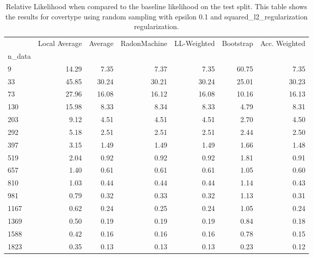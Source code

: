 \begin{table}
\centering
\caption{Relative Likelihood when compared to the baseline likelihood on the test split. This table shows the results for  covertype using  random sampling with epsilon  0.1 and  squared_l2_regularization regularization.}
\label{tab:14}
\begin{tabular}{lrrrrrr}
\toprule
{} &  Local Average &  Average &  RadonMachine &  LL-Weighted &  Bootstrap &  Acc. Weighted \\
n\_data &                &          &               &              &            &                \\
\midrule
9      &          14.29 &     7.35 &          7.37 &         7.35 &      60.75 &           7.35 \\
33     &          45.85 &    30.24 &         30.21 &        30.24 &      25.01 &          30.23 \\
73     &          27.96 &    16.08 &         16.12 &        16.08 &      10.16 &          16.13 \\
130    &          15.98 &     8.33 &          8.34 &         8.33 &       4.79 &           8.31 \\
203    &           9.12 &     4.51 &          4.51 &         4.51 &       2.70 &           4.50 \\
292    &           5.18 &     2.51 &          2.51 &         2.51 &       2.44 &           2.50 \\
397    &           3.15 &     1.49 &          1.49 &         1.49 &       1.66 &           1.48 \\
519    &           2.04 &     0.92 &          0.92 &         0.92 &       1.81 &           0.91 \\
657    &           1.40 &     0.61 &          0.61 &         0.61 &       1.05 &           0.60 \\
810    &           1.03 &     0.44 &          0.44 &         0.44 &       1.14 &           0.43 \\
981    &           0.79 &     0.32 &          0.33 &         0.32 &       1.13 &           0.31 \\
1167   &           0.62 &     0.24 &          0.25 &         0.24 &       1.05 &           0.24 \\
1369   &           0.50 &     0.19 &          0.19 &         0.19 &       0.84 &           0.18 \\
1588   &           0.42 &     0.16 &          0.16 &         0.16 &       0.78 &           0.15 \\
1823   &           0.35 &     0.13 &          0.13 &         0.13 &       0.23 &           0.12 \\
\bottomrule
\end{tabular}
\end{table}
